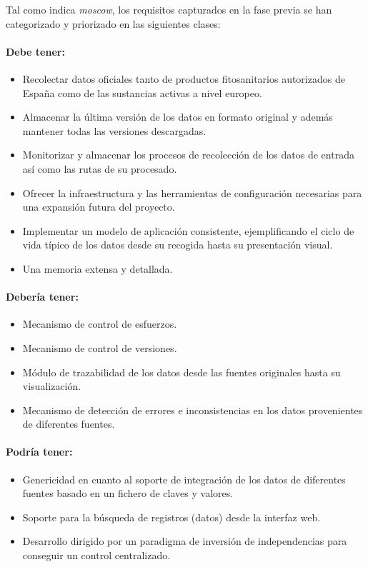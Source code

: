 Tal como indica \textit{\gls{moscow}}, los requisitos capturados en la fase previa se han categorizado y priorizado en las siguientes clases: 

\paragraph*{Debe tener:} 
\begin{itemize}
\item Recolectar datos oficiales tanto de productos fitosanitarios autorizados de España como de las sustancias activas a nivel europeo. 
\item Almacenar la última versión de los datos en formato original y además mantener todas las versiones descargadas. 
\item Monitorizar y almacenar los procesos de recolección de los datos de entrada así como las rutas de su procesado.
\item Ofrecer la infraestructura y las herramientas de configuración necesarias para una expansión futura del proyecto. 
\item Implementar un modelo de aplicación consistente, ejemplificando el ciclo de vida típico de los datos desde su recogida hasta su presentación visual. 
\item Una memoria extensa y detallada. 
\end{itemize}

\paragraph*{Debería tener:} 
\begin{itemize}
\item Mecanismo de control de esfuerzos.
\item Mecanismo de control de versiones.
\item Módulo de trazabilidad de los datos desde las fuentes originales hasta su visualización. 
\item Mecanismo de detección de errores e inconsistencias en los datos provenientes de diferentes fuentes. 
\end{itemize}


\paragraph*{Podría tener:} 
\begin{itemize}
\item Genericidad en cuanto al soporte de integración de los datos de diferentes fuentes basado en un fichero de claves y valores. 
\item Soporte para la búsqueda de registros (datos) desde la interfaz web. 
\item Desarrollo dirigido por un paradigma de inversión de independencias para conseguir un control centralizado.
\end{itemize}

